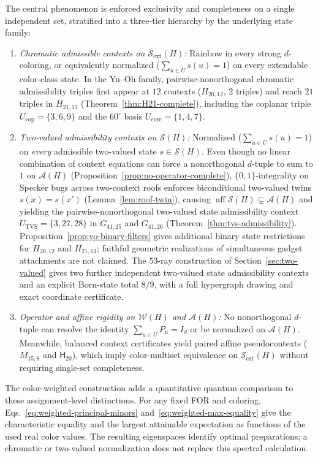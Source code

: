 \documentclass[aps,pra,reprint,superscriptaddress,longbibliography,nofootinbib,floatfix,10pt]{revtex4-2}
\theoremstyle{definition}\newtheorem{definition}[theorem]{Definition}
\theoremstyle{remark}\newtheorem{remark}[theorem]{Remark}
\newcommand{\Sc}{\mathcal S}\newcommand{\Cc}{\mathcal C}\newcommand{\Wc}{\mathcal W}
\newcommand{\Htwenty}{\mathsf H_{20}}
\begin{document}
The central phenomenon is enforced exclusivity and completeness on a single independent set, stratified into a three-tier hierarchy by the underlying state family:
\begin{enumerate}
\item \emph{Chromatic admissible contexts on $\Sc_{\mathrm{ext}}(H)$:} Rainbow in every strong $d$-coloring, or equivalently normalized ($\sum_{u\in U}s(u)=1$) on every extendable color-class state. In the Yu--Oh family, pairwise-nonorthogonal chromatic admissibility triples first appear at $12$ contexts ($H_{20,12}$, $2$ triples) and reach $21$ triples in $H_{21,13}$ (Theorem~\ref{thm:H21-complete}), including the coplanar triple $U_{\mathrm{cop}}=\{3,6,9\}$ and the $60^\circ$ basis $U_{\mathrm{core}}=\{1,4,7\}$.
\item \emph{Two-valued admissibility contexts on $\Sc(H)$:} Normalized ($\sum_{u\in U}s(u)=1$) on \emph{every} admissible two-valued state $s\in\Sc(H)$. Even though no linear combination of context equations can force a nonorthogonal $d$-tuple to sum to $1$ on $\mathcal A(H)$ (Proposition~\ref{prop:no-operator-complete}), $\{0,1\}$-integrality on Specker bugs across two-context roofs enforces biconditional two-valued twins $s(x)=s(x')$ (Lemma~\ref{lem:roof-twin}), causing $\operatorname{aff}\Sc(H)\subsetneq\mathcal A(H)$ and yielding the pairwise-nonorthogonal two-valued state admissibility context $U_{\mathrm{TVS}}=\{3,27,28\}$ in $G_{41,25}$ and $G_{41,26}$ (Theorem~\ref{thm:tvs-admissibility}). Proposition~\ref{prop:yo-binary-filters} gives additional binary state restrictions for $H_{20,12}$ and $H_{21,13}$; faithful geometric realizations of simultaneous gadget attachments are not claimed. The $53$-ray construction of Section~\ref{sec:two-valued} gives two further independent two-valued state admissibility contexts and an explicit Born-state total $8/9$, with a full hypergraph drawing and exact coordinate certificate.
\item \emph{Operator and affine rigidity on $\Wc(H)$ and $\mathcal A(H)$:} No nonorthogonal $d$-tuple can resolve the identity $\sum_{u\in U}P_u=I_d$ or be normalized on $\mathcal A(H)$. Meanwhile, balanced context certificates yield paired affine pseudocontexts ($M_{15,8}$ and $\Htwenty$), which imply color-multiset equivalence on $\Sc_{\mathrm{ext}}(H)$ without requiring single-set completeness.
\end{enumerate}

The color-weighted construction adds a quantitative quantum comparison to these assignment-level distinctions. For any fixed FOR and coloring, Eqs.~\eqref{eq:weighted-principal-minors} and~\eqref{eq:weighted-max-equality} give the characteristic equality and the largest attainable expectation as functions of the used real color values. The resulting eigenspaces identify optimal preparations; a chromatic or two-valued normalization does not replace this spectral calculation.
\end{document}
